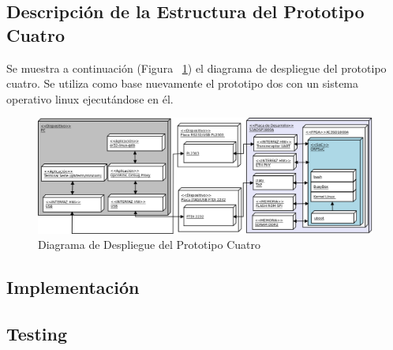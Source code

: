 		\newpage
		
		\subsection{Descripción de la Estructura del Prototipo Cuatro}
		Se muestra a continuación (Figura ~\ref{fig:proto4}) el diagrama de despliegue del prototipo cuatro. Se utiliza como base nuevamente el prototipo
		dos con un sistema operativo linux ejecutándose en él.

		\begin{figure}[h!]
 		\begin{center}
  		\includegraphics[width=1\textwidth,keepaspectratio=true]{./images/proto4}
  		\caption{Diagrama de Despliegue del Prototipo Cuatro}
  		\label{fig:proto4} 
 		\end{center}
		\end{figure}
	
		\newpage

		\subsection{Implementación}	
		
		\subsection{Testing}
		
